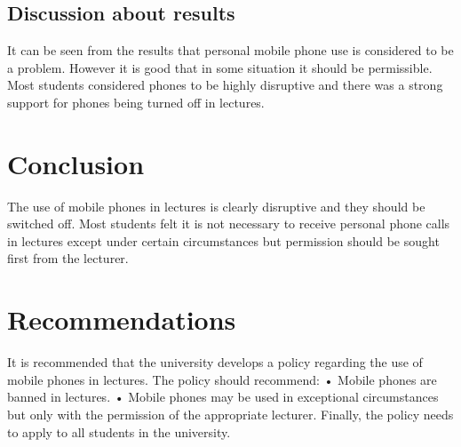 \documentclass[14pt]{article}
\begin{document}
\subsection{Discussion about results}

It can be seen from the results that personal mobile phone use is considered to be a problem. However it is good that in some situation it should be permissible. Most students considered phones to be highly disruptive and there was a strong support for phones being turned off in lectures.

\section{Conclusion}

The use of mobile phones in lectures is clearly disruptive and they should be switched off. Most students felt it is not necessary to receive personal phone calls in lectures except under certain circumstances but permission should be sought first from the lecturer.

\section{Recommendations}

It is recommended that the university develops a policy regarding the use of mobile phones in lectures. The policy should recommend:
•	Mobile phones are banned in lectures.
•	Mobile phones may be used in exceptional circumstances but only with the permission of the appropriate lecturer.
Finally, the policy needs to apply to all students in the university.
 
\end{document}
